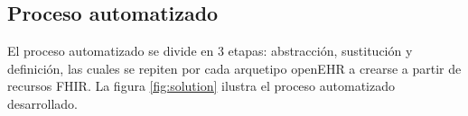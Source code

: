 \subsection{Proceso automatizado}

El proceso automatizado se divide en 3 etapas: abstracción, sustitución y definición, las cuales se repiten por cada arquetipo openEHR a crearse a partir de recursos FHIR. La figura \ref{fig:solution} ilustra el proceso automatizado desarrollado.






